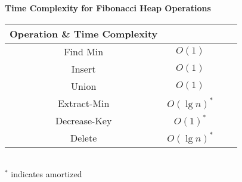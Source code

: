 \begin{center}
	\textbf{Time Complexity for Fibonacci Heap Operations}
 \begin{tabular}{c c c c||} 
 \hline
 Operation \& Time Complexity \\ [0.5ex] 
 \hline\hline
 Find Min & $O(1)$ \\ 
 \hline
 Insert & $O(1)$ \\
 \hline
 Union & $O(1)$ \\
 \hline
 Extract-Min & $O(\lg{n})^{*}$ \\
 \hline
 Decrease-Key & $O(1)^{*}$ \\
 \hline
 Delete & $O(\lg{n})^{*}$ \\ [1ex] 
 \hline
\end{tabular}\\
$^{*}$ indicates amortized
\end{center}









